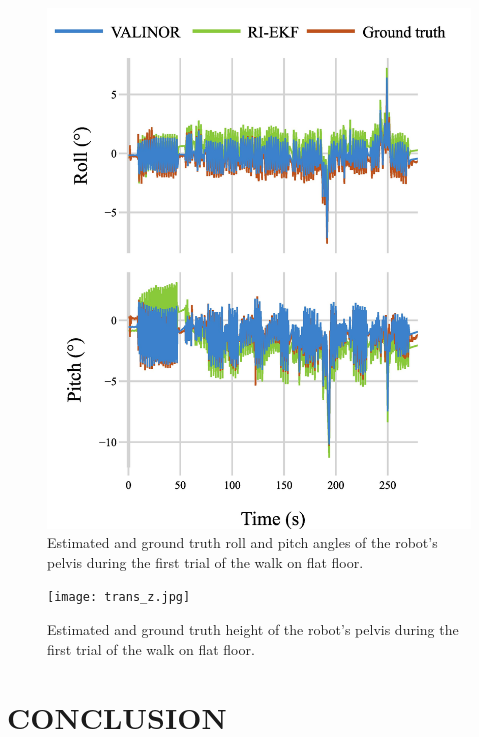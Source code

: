 \documentclass{IJCAS}
\begin{document}
\begin{figure}[!ht]
\begin{center}
\includegraphics[width=\columnwidth]{tilt.jpg} 
\vskip -0.5pc
\caption{Estimated and ground truth roll and pitch angles of the robot's pelvis during the first trial of the walk on flat floor.}\label{fig:tilt_rhps1}
\end{center}
\vskip -1.5pc
\end{figure}

\begin{figure}[!ht]
\begin{center}
\texttt{[image: trans\_z.jpg]} 
\vskip -0.5pc
\caption{Estimated and ground truth height of the robot's pelvis during the first trial of the walk on flat floor.}\label{fig:trans_z_rhps1}
\end{center}
\vskip -1.5pc
\end{figure}

\section{CONCLUSION}
\end{document}
